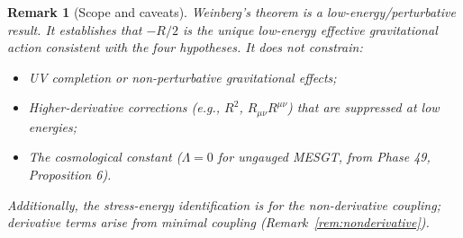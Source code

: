 \documentclass[11pt]{article}
\newtheorem{remark}{Remark}
\begin{document}
\begin{remark}[Scope and caveats]\label{rem:scope}
Weinberg's theorem is a low-energy/perturbative result. It establishes
that $-R/2$ is the unique \emph{low-energy effective} gravitational
action consistent with the four hypotheses. It does not constrain:
\begin{itemize}
\item UV completion or non-perturbative gravitational effects;
\item Higher-derivative corrections (e.g., $R^2$, $R_{\mu\nu}R^{\mu\nu}$)
  that are suppressed at low energies;
\item The cosmological constant ($\Lambda = 0$ for ungauged MESGT,
  from Phase 49, Proposition 6).
\end{itemize}
Additionally, the stress-energy identification is for the
non-derivative coupling; derivative terms arise from minimal
coupling (Remark~\ref{rem:nonderivative}).
\end{remark}
\end{document}
